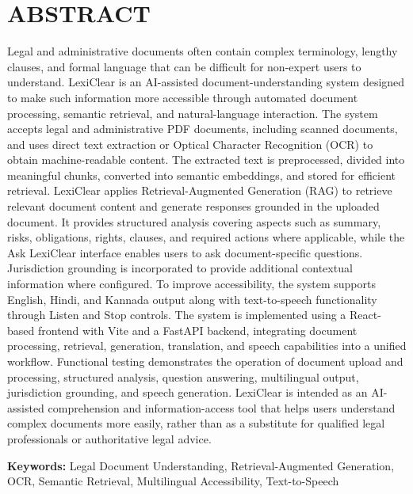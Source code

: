 \documentclass[12pt,a4paper,oneside]{report}
\begin{document}
\chapter*{\centering\Large\bfseries ABSTRACT}
\pagestyle{frontmatter}
Legal and administrative documents often contain complex terminology, lengthy clauses, and formal language that can be difficult for non-expert users to understand. LexiClear is an AI-assisted document-understanding system designed to make such information more accessible through automated document processing, semantic retrieval, and natural-language interaction. The system accepts legal and administrative PDF documents, including scanned documents, and uses direct text extraction or Optical Character Recognition (OCR) to obtain machine-readable content. The extracted text is preprocessed, divided into meaningful chunks, converted into semantic embeddings, and stored for efficient retrieval. LexiClear applies Retrieval-Augmented Generation (RAG) to retrieve relevant document content and generate responses grounded in the uploaded document. It provides structured analysis covering aspects such as summary, risks, obligations, rights, clauses, and required actions where applicable, while the Ask LexiClear interface enables users to ask document-specific questions. Jurisdiction grounding is incorporated to provide additional contextual information where configured. To improve accessibility, the system supports English, Hindi, and Kannada output along with text-to-speech functionality through Listen and Stop controls. The system is implemented using a React-based frontend with Vite and a FastAPI backend, integrating document processing, retrieval, generation, translation, and speech capabilities into a unified workflow. Functional testing demonstrates the operation of document upload and processing, structured analysis, question answering, multilingual output, jurisdiction grounding, and speech generation. LexiClear is intended as an AI-assisted comprehension and information-access tool that helps users understand complex documents more easily, rather than as a substitute for qualified legal professionals or authoritative legal advice.

\par\medskip\noindent\textbf{Keywords:} Legal Document Understanding, Retrieval-Augmented Generation, OCR, Semantic Retrieval, Multilingual Accessibility, Text-to-Speech

\clearpage
\end{document}
